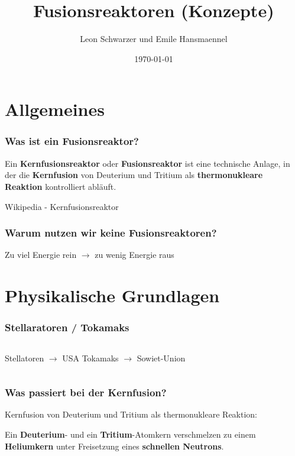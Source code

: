 \documentclass[aspectratio=169]{beamer}
\title{Fusionsreaktoren (Konzepte)}
\subtitle{}
\author{Leon Schwarzer und Emile Hansmaennel}
\institute{Theodor-Fliedner-Gymnasium}
\date{\today}
\begin{document}
  \begin{frame}
    \titlepage
  \end{frame}

  \section{Allgemeines}
    \begin{frame}
      \frametitle{Was ist ein Fusionsreaktor?}
      Ein \textbf{Kernfusionsreaktor} oder \textbf{Fusionsreaktor} ist eine
      technische Anlage, in der die \textbf{Kernfusion} von Deuterium und Tritium als
      \textbf{thermonukleare Reaktion} kontrolliert abläuft.
      \par
      \raggedleft
      Wikipedia - Kernfusionsreaktor
    \end{frame}

    \begin{frame}
      \frametitle{Warum nutzen wir keine Fusionsreaktoren?}
      \center
      Zu viel Energie rein \( \rightarrow \) zu wenig Energie raus
    \end{frame}

  \section{Physikalische Grundlagen}

    \begin{frame}
      \frametitle{Stellaratoren / Tokamaks}
      \begin{columns}
          \center
          Stellatoren \( \rightarrow \) USA
          \bigskip
          \center
          Tokamaks \( \rightarrow \) Sowiet-Union
      \end{columns}
    \end{frame}

    \begin{frame}
      \frametitle{Was passiert bei der Kernfusion?}
      \center
      Kernfusion von Deuterium und Tritium als thermonukleare Reaktion:

      \bigskip
      \pause

      \bigskip

      Ein \textbf{Deuterium}- und ein \textbf{Tritium}-Atomkern verschmelzen zu einem \textbf{Heliumkern} unter Freisetzung eines \textbf{schnellen Neutrons}.

    \end{frame}
\end{document}
